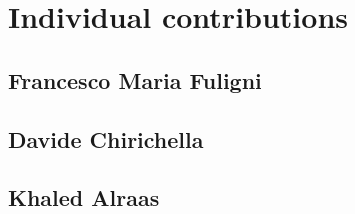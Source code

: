 \section{Individual contributions}
\subsection{Francesco Maria Fuligni}
\subsection{Davide Chirichella}
\subsection{Khaled Alraas}
